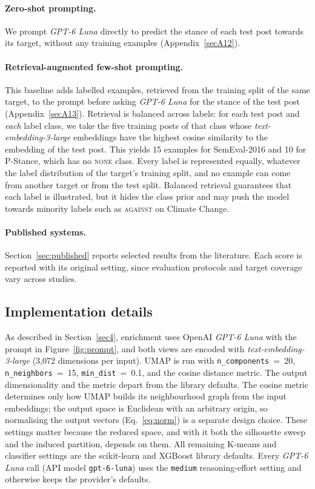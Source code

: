 \documentclass[pdflatex,sn-mathphys-num,iicol]{sn-jnl}%
\begin{document}
\paragraph{Zero-shot prompting.} We prompt \textit{GPT-6 Luna} directly to predict the stance of each test post towards its target, without any training examples (Appendix~\ref{secA12}).

\paragraph{Retrieval-augmented few-shot prompting.} This baseline adds labelled examples, retrieved from the training split of the same target, to the prompt before asking \textit{GPT-6 Luna} for the stance of the test post (Appendix~\ref{secA13}). Retrieval is balanced across labels: for each test post and \emph{each} label class, we take the five training posts of that class whose \textit{text-embedding-3-large} embeddings have the highest cosine similarity to the embedding of the test post. This yields 15 examples for SemEval-2016 and 10 for P-Stance, which has no \textsc{none} class. Every label is represented equally, whatever the label distribution of the target's training split, and no example can come from another target or from the test split. Balanced retrieval guarantees that each label is illustrated, but it hides the class prior and may push the model towards minority labels such as \textsc{against} on Climate Change.

\paragraph{Published systems.} Section~\ref{sec:published} reports selected results from the literature. Each score is reported with its original setting, since evaluation protocols and target coverage vary across studies.

\subsection{Implementation details}\label{subsec54}
As described in Section~\ref{sec4}, enrichment uses OpenAI \textit{GPT-6 Luna} with the prompt in Figure~\ref{fig:prompt}, and both views are encoded with \textit{text-embedding-3-large} (3{,}072 dimensions per input). UMAP is run with \texttt{n\_components}~=~20, \texttt{n\_neighbors}~=~15, \texttt{min\_dist}~=~0.1, and the cosine distance metric. The output dimensionality and the metric depart from the library defaults. The cosine metric determines only how UMAP builds its neighbourhood graph from the input embeddings; the output space is Euclidean with an arbitrary origin, so normalising the output vectors (Eq.~\eqref{eq:norm}) is a separate design choice. These settings matter because the reduced space, and with it both the silhouette sweep and the induced partition, depends on them. All remaining K-means and classifier settings are the scikit-learn and XGBoost library defaults. Every \textit{GPT-6 Luna} call (API model \texttt{gpt-6-luna}) uses the \texttt{medium} reasoning-effort setting and otherwise keeps the provider's defaults.
\end{document}
